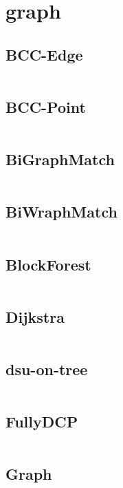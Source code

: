 \documentclass[a4]{article}
\begin{document}
\section{graph}
\subsection{BCC-Edge}
\inputminted[mathescape,linenos,numbersep=5pt,frame=lines,framesep=2mm]{cpp}{src/graph/BCC-Edge.cpp}
\subsection{BCC-Point}
\inputminted[mathescape,linenos,numbersep=5pt,frame=lines,framesep=2mm]{cpp}{src/graph/BCC-Point.cpp}
\subsection{BiGraphMatch}
\inputminted[mathescape,linenos,numbersep=5pt,frame=lines,framesep=2mm]{cpp}{src/graph/BiGraphMatch.cpp}
\subsection{BiWraphMatch}
\inputminted[mathescape,linenos,numbersep=5pt,frame=lines,framesep=2mm]{cpp}{src/graph/BiWraphMatch.cpp}
\subsection{BlockForest}
\inputminted[mathescape,linenos,numbersep=5pt,frame=lines,framesep=2mm]{cpp}{src/graph/BlockForest.cpp}
\subsection{Dijkstra}
\inputminted[mathescape,linenos,numbersep=5pt,frame=lines,framesep=2mm]{cpp}{src/graph/Dijkstra.cpp}
\subsection{dsu-on-tree}
\inputminted[mathescape,linenos,numbersep=5pt,frame=lines,framesep=2mm]{cpp}{src/graph/dsu-on-tree.cpp}
\subsection{FullyDCP}
\inputminted[mathescape,linenos,numbersep=5pt,frame=lines,framesep=2mm]{cpp}{src/graph/FullyDCP.cpp}
\subsection{Graph}
\inputminted[mathescape,linenos,numbersep=5pt,frame=lines,framesep=2mm]{cpp}{src/graph/Graph.cpp}
\end{document}
